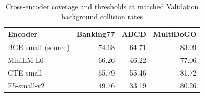 \begin{table}[!htb]
\caption{Cross-encoder coverage and thresholds at matched Validation background collision rates}
\label{tab:cross-encoder-calibrated}
\centering\footnotesize
\setlength{\tabcolsep}{3pt}
\renewcommand{\arraystretch}{1.00}
\begin{tabular*}{\columnwidth}{@{\extracolsep{\fill}}lrrr@{}}
\toprule
Encoder & Banking77 & ABCD & MultiDoGO \\
\midrule
BGE-small (source) & 74.68 & 64.71 & 83.09 \\
MiniLM-L6 & 66.26 & 46.22 & 77.06 \\
GTE-small & 65.79 & 55.46 & 81.72 \\
E5-small-v2 & 49.76 & 33.19 & 80.26 \\
\bottomrule
\end{tabular*}
\end{table}
